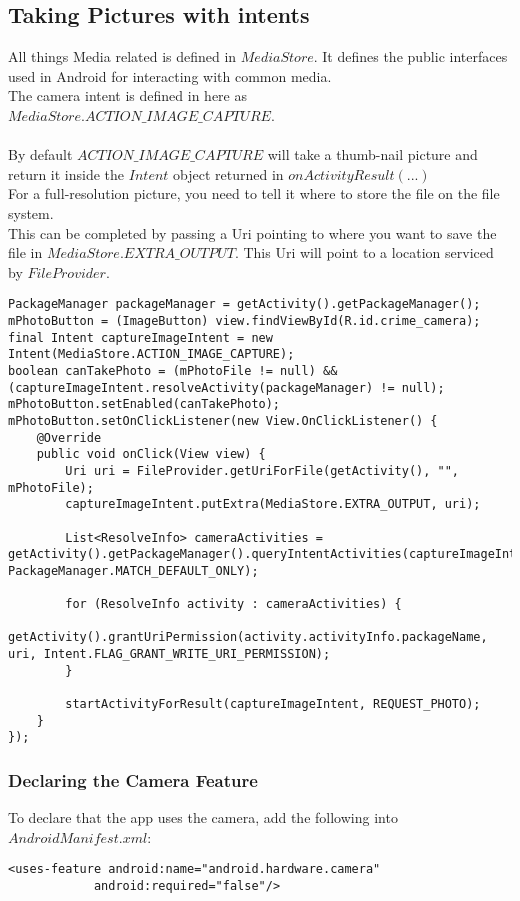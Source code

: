 \documentclass[]{article}
\begin{document}
\subsection{Taking Pictures with intents}
All things Media related is defined in $MediaStore$.  It defines the public interfaces used in Android for interacting with common media.
\\
The camera intent is defined in here as $MediaStore.ACTION\_IMAGE\_CAPTURE$.
\\\\
By default $ACTION\_IMAGE\_CAPTURE$ will take a thumb-nail picture and return it inside the $Intent$ object returned in $onActivityResult(...)$
\\
For a full-resolution picture, you need to tell it where to store the file on the file system. 
\\
This can be completed by passing a Uri pointing to where you want to save the file in $MediaStore.EXTRA\_OUTPUT$.  This Uri will point to a location serviced by $FileProvider$.
\begin{lstlisting}
PackageManager packageManager = getActivity().getPackageManager();
mPhotoButton = (ImageButton) view.findViewById(R.id.crime_camera);
final Intent captureImageIntent = new Intent(MediaStore.ACTION_IMAGE_CAPTURE);
boolean canTakePhoto = (mPhotoFile != null) && (captureImageIntent.resolveActivity(packageManager) != null);
mPhotoButton.setEnabled(canTakePhoto);
mPhotoButton.setOnClickListener(new View.OnClickListener() {
	@Override
	public void onClick(View view) {
		Uri uri = FileProvider.getUriForFile(getActivity(), "", mPhotoFile);
		captureImageIntent.putExtra(MediaStore.EXTRA_OUTPUT, uri);

		List<ResolveInfo> cameraActivities = getActivity().getPackageManager().queryIntentActivities(captureImageIntent, PackageManager.MATCH_DEFAULT_ONLY);

		for (ResolveInfo activity : cameraActivities) {
			getActivity().grantUriPermission(activity.activityInfo.packageName, uri, Intent.FLAG_GRANT_WRITE_URI_PERMISSION);
		}

		startActivityForResult(captureImageIntent, REQUEST_PHOTO);
	}
});
\end{lstlisting}
\subsubsection{Declaring the Camera Feature}
To declare that the app uses the camera, add the following into $AndroidManifest.xml$:
\begin{lstlisting}
<uses-feature android:name="android.hardware.camera"
			android:required="false"/>
\end{lstlisting}
\end{document}
